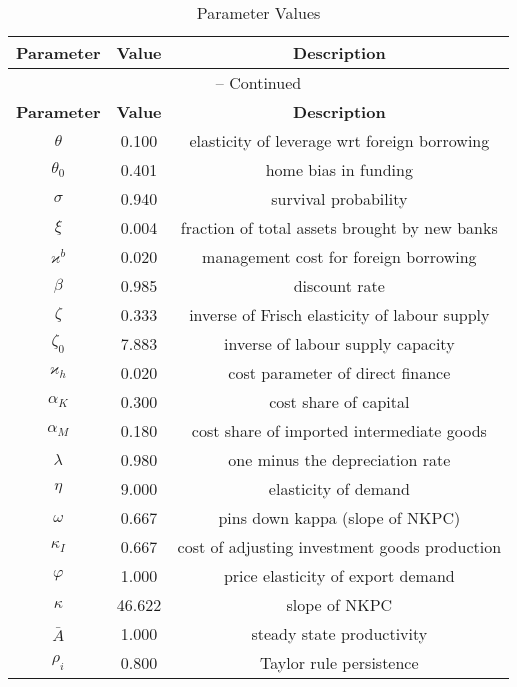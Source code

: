 \begin{center}
\begin{longtable}{ccc}
\caption{Parameter Values}\\%
\toprule%
\multicolumn{1}{c}{\textbf{Parameter}} &
\multicolumn{1}{c}{\textbf{Value}} &
 \multicolumn{1}{c}{\textbf{Description}}\\%
\midrule%
\endfirsthead
\multicolumn{3}{c}{{\tablename} \thetable{} -- Continued}\\%
\midrule%
\multicolumn{1}{c}{\textbf{Parameter}} &
\multicolumn{1}{c}{\textbf{Value}} &
  \multicolumn{1}{c}{\textbf{Description}}\\%
\midrule%
\endhead
$\theta$ 	 & 	 0.100 	 & 	 elasticity of leverage wrt foreign borrowing\\
$\theta_{0}$ 	 & 	 0.401 	 & 	 home bias in funding\\
$\sigma$ 	 & 	 0.940 	 & 	 survival probability\\
$\xi$ 	 & 	 0.004 	 & 	 fraction of total assets brought by new banks\\
$\varkappa^{b}$ 	 & 	 0.020 	 & 	 management cost for foreign borrowing\\
$\beta$ 	 & 	 0.985 	 & 	 discount rate\\
$\zeta$ 	 & 	 0.333 	 & 	 inverse of Frisch elasticity of labour supply\\
$\zeta_{0}$ 	 & 	 7.883 	 & 	 inverse of labour supply capacity\\
$\varkappa_{h}$ 	 & 	 0.020 	 & 	 cost parameter of direct finance\\
$\alpha_{K}$ 	 & 	 0.300 	 & 	 cost share of capital\\
$\alpha_{M}$ 	 & 	 0.180 	 & 	 cost share of imported intermediate goods\\
$\lambda$ 	 & 	 0.980 	 & 	 one minus the depreciation rate\\
$\eta$ 	 & 	 9.000 	 & 	 elasticity of demand\\
$\omega$ 	 & 	 0.667 	 & 	 pins down kappa (slope of NKPC)\\
$\kappa_{I}$ 	 & 	 0.667 	 & 	 cost of adjusting investment goods production\\
$\varphi$ 	 & 	 1.000 	 & 	 price elasticity of export demand\\
$\kappa$ 	 & 	 46.622 	 & 	 slope of NKPC\\
$\bar{A}$ 	 & 	 1.000 	 & 	 steady state productivity\\
$\rho_{i}$ 	 & 	 0.800 	 & 	 Taylor rule persistence\\

\end{longtable}
\end{center}
